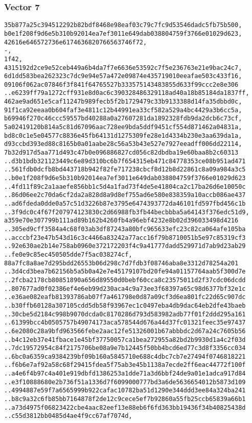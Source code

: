 \documentclass[
]{article}
\begin{document}
\subsubsection{Vector 7}\label{vector-7-2}

\begin{verbatim}
35b877a25c394512292b82bdf8468e98eaf03c79c7fc9d53546dadc5fb75b500,
b0e1f208f9d6e5b310b92014ea7ef3011e649dab038804759f3766e01029d623,
42616e646572736e6174636820766563746f72,
-,
1f42,
4315192d2ce9e52ceb449a6b4da7f7e6636e53592c7f5e236763e21e9bac24c7,
6d1dd583bea262323c7dc9e94e57a472e09874e435719010eeafae503c433f16,
09106f062ac07846f3f841f64765527b333575143483855d633f99ccc2e8e306
..e6239ff79a1272cff931e8d0ac6c390328486329118ad40a18b85184da1837ff,
462ae9ad651e5caf11247b989fecb5f2b1729479c33b9133388d14fa35dbbd0c,
91f1ca92eeaa0b604faf3e4811c12b44991ea33cf582a529a4bc4429a3b6cc5a,
b69946f270c46ccc59557bd40288a0a27607281da1892328fdb9da2dcb6c73cf,
5a02419120b814a5c81d67096aac728ee9bda5ddf9451cf554d871462a04831a,
bd8c0c1e5e04577c8836e45fb64131d1275309fe28e1d4334b230e3aa639da1a,
d93ccbd393ed88c8165b0a01aabe28c56a53b43e527e7927eeadff006dd22114,
7b32d917d5aa771d493c47b0e096886827cd056c82dbdba19e60baa8b2c60313
..d3b1bdb321123449c6e89d310bc6b7f654315eb471c84778353ce08b951ad471
..561fdb0dcfb8bd443718b942f82fe717238cbcf8d12b8d22861c8a09a984a3c5
..b0e1f208f9d6e5b310b92014ea7ef3011e649dab038804759f3766e01029d623
..4fd11f89c2a1aaefe856bb1c5d4a1fad73f4de5e41804ca2c17ba26d6e10050c
..86d06ee2c70da6cf2da2a828d8a9d8ef755ad6e580e838359a10accb086ae437
..ad6fdeda0dde0a57c51d3226b87e3795e6474393772da46101fd597fbd456c1b
..3f9dc0c4f67f207974123830c2d66988fb3fb44becbbba5a64143f376edc51d9,
a359e70e307799b111ad89b162b4260fb4a96ebf4232e8b02d396033498d4216
..305ed9cff3584a4c68f03ab3df87243a80bfc965633efc23c82ca064afe105ba
..acccbf23e47b543d16c3c4466a83242a77acc16f79b8710051b5e97c85319cf3
..92e630ae2b14e758ab0960e372172203f4c9a41777dadd529971d7ab9d23ab29
..fe0e9c85ec450505dde7f5ac038274cf,
88a7fc8a8ae7d295bdd26553b06d298c7d7fdb3f08746aba8e3312d78254a201
..3d4cd3bea7b62156b5a5b0a42e7e45179107bd20fe94a01157764aab5f300d7e
..2fcba2178cb80851890a656d89550d0bebf60cca8c23575011d2f37cdc06dcdd
..807677ad0f02386ef4e6eb99d230aca4c9a73ee3f68397a65c98d6377bf32e1c
..e36ae082eafb81393786ab07f7a461798e0d87a09cf3d6ea801fc22d65c907dc
..b30ffb60128a307105cdd5db58f93967ec1c0497eba4db9dac64eb2dfe43baeb
..30cbe5d2184c998b9070dcda0c8170286d793d583982adb77f01f2ddd295a161
..61399bcc4b0505757b49074173aca578544d676a44d37fc01321feec35e97437
..6e2080c28a9bfd963566febe2aac12fe51326001b67abbbdc2d67a24c7605b56
..b4c12eb37e41fbace1e45bf37750057ca1bea272955a82bd2b9930d1a4c2f03d
..7dc19572954c84f2175706be08a9e7b12445f50bb4bcd6ed77c3d8f3356cc034
..6bc0a6359ca9384239bf09b160a5845710e688c4dbc7cb7e27494f0746818221
..f6b6e7af92a58c68f29415fdea5f75ab3e45b1138a7ecde2ff6eac44772f100f
..a4e6f4b97c4a401e919dbfd1386253a1dde71a3d6bbf24de9a01e1adca917d84
..e3f10888680e2b736f51a1336d7f6099000777bd3a6de5636654012b5873d109
..4994887e59f7a6565999b922cafac10782ba51d1290e344ddd3ee84a324ba241
..b8c9a32c6fb85bb7164878f2de12c9cece5ef7b92860a55fb25ccb65839a66b1
..a73d4975f06823422cbe4aac82eef13e88eb6f6fd363bb19436f34b40825438d
..c55d3812bb0485d4ae4f9cc67af7074d,
\end{verbatim}
\end{document}
